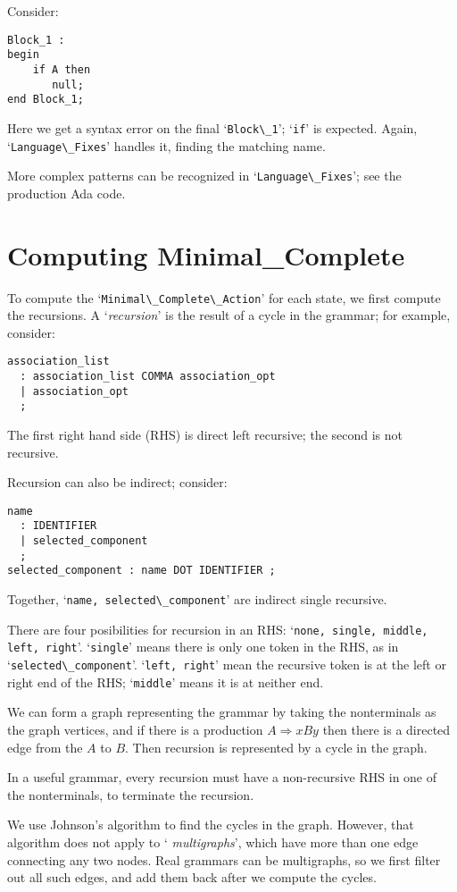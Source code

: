 \documentclass{article}
\newcommand{\code}[1]{`\lstinline|#1|'}
\begin{document}
Consider:
\begin{lstlisting}
Block_1 :
begin
    if A then
       null;
end Block_1;
\end{lstlisting}
Here we get a syntax error on the final \code{Block\_1}; \code{if} is
expected. Again, \code{Language\_Fixes} handles it, finding the
matching name.

More complex patterns can be recognized in \code{Language\_Fixes}; see
the production Ada code.

\section{Computing Minimal\_Complete}
\label{minimal-complete-compute}
To compute the \code{Minimal\_Complete\_Action} for each state, we
first compute the recursions. A `{\it recursion}' is the result of a
cycle in the grammar; for example, consider:
\begin{verbatim}
association_list
  : association_list COMMA association_opt
  | association_opt
  ;
\end{verbatim}
The first right hand side (RHS) is direct left recursive; the second
is not recursive.

Recursion can also be indirect; consider:
\begin{verbatim}
name
  : IDENTIFIER
  | selected_component
  ;
selected_component : name DOT IDENTIFIER ;
\end{verbatim}
Together, \code{name, selected\_component} are indirect single recursive.

There are four posibilities for recursion in an RHS: \code{none,
single, middle, left, right}. \code{single} means there is only one
token in the RHS, as in \code{selected\_component}. \code{left, right}
mean the recursive token is at the left or right end of the RHS;
\code{middle} means it is at neither end.

We can form a graph representing the grammar by taking the
nonterminals as the graph vertices, and if there is a production $A
\Rightarrow xBy$ then there is a directed edge from the $A$ to $B$.
Then recursion is represented by a cycle in the graph.

In a useful grammar, every recursion must have a non-recursive
RHS in one of the nonterminals, to terminate the recursion.

We use Johnson's algorithm \cite{graph-cycles} to find the cycles in
the graph. However, that algorithm does not apply to `{\it
  multigraphs}', which have more than one edge connecting any two
nodes. Real grammars can be multigraphs, so we first filter out all
such edges, and add them back after we compute the cycles.
\end{document}
